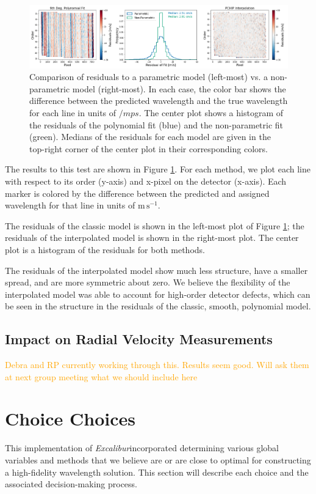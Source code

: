 \documentclass[twocolumn]{aastex63}
\newcommand{\lz}[1]{\textcolor{orange}{#1}}
\newcommand{\project}[1]{\textsl{#1}}
\newcommand{\name}{\project{Excalibur}}
\newcommand{\mps}{\mathrm{m\,s^{-1}}}
\begin{document}
\begin{figure}[t]
\centering
\includegraphics[width=\textwidth]{Figures/parametricTest.png}
\caption{Comparison of residuals to a parametric model (left-most) vs. a non-parametric model (right-most).  In each case, the color bar shows the difference between the predicted wavelength and the true wavelength for each line in units of $/mps$.  The center plot shows a histogram of the residuals of the polynomial fit (blue) and the non-parametric fit (green).  Medians of the residuals for each model are given in the top-right corner of the center plot in their corresponding colors.}
\label{fig:comparison}
\end{figure}

The results to this test are shown in Figure \ref{fig:comparison}.  For each method, we plot each line with respect to its order (y-axis) and x-pixel on the detector (x-axis).  Each marker is colored by the difference between the predicted and assigned wavelength for that line in units of $\mps$.

The residuals of the classic model is shown in the left-most plot of Figure \ref{fig:comparison}; the residuals of the interpolated model is shown in the right-most plot.  The center plot is a histogram of the residuals for both methods.

The residuals of the interpolated model show much less structure, have a smaller spread, and are more symmetric about zero.  We believe the flexibility of the interpolated model was able to account for high-order detector defects, which can be seen in the structure in the residuals of the classic, smooth, polynomial model.

\subsection{Impact on Radial Velocity Measurements}\label{sec:test-rv}
\lz{Debra and RP currently working through this.  Results seem good.  Will ask them at next group meeting what we should include here}


\section{Choice Choices} \label{sec:choices}
This implementation of \name incorporated determining various global variables and methods that we believe are or are close to optimal for constructing a high-fidelity wavelength solution.  This section will describe each choice and the associated decision-making process.
\end{document}
